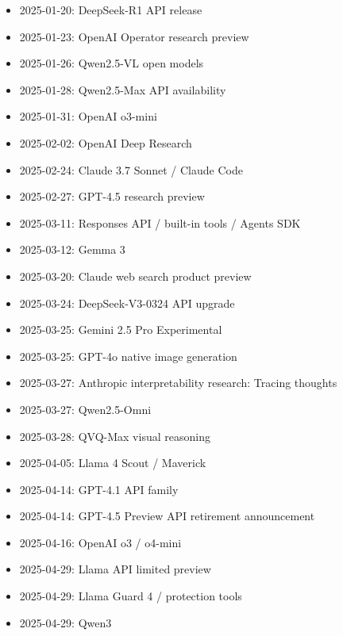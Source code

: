
\begin{itemize}
  \item 2025-01-20: DeepSeek-R1 API release
  \item 2025-01-23: OpenAI Operator research preview
  \item 2025-01-26: Qwen2.5-VL open models
  \item 2025-01-28: Qwen2.5-Max API availability
  \item 2025-01-31: OpenAI o3-mini
\end{itemize}
\autocite{src-650b567698aa,src-8c485019ad8d,src-8f8555b73e1b,src-95b210494c88,src-dc21f366b638}

\begin{itemize}
  \item 2025-02-02: OpenAI Deep Research
  \item 2025-02-24: Claude 3.7 Sonnet / Claude Code
  \item 2025-02-27: GPT-4.5 research preview
\end{itemize}
\autocite{src-3fa7f4cd510b,src-8fec3ef3a97d,src-a6c92f94a0af}

\begin{itemize}
  \item 2025-03-11: Responses API / built-in tools / Agents SDK
  \item 2025-03-12: Gemma 3
  \item 2025-03-20: Claude web search product preview
  \item 2025-03-24: DeepSeek-V3-0324 API upgrade
  \item 2025-03-25: Gemini 2.5 Pro Experimental
  \item 2025-03-25: GPT-4o native image generation
  \item 2025-03-27: Anthropic interpretability research: Tracing thoughts
  \item 2025-03-27: Qwen2.5-Omni
  \item 2025-03-28: QVQ-Max visual reasoning
\end{itemize}
\autocite{src-1bb16d7254b1,src-421ee9af3f80,src-6e15bd50b7db,src-78593f4b387f,src-877e7da88408,src-8cb736b33646,src-8f8555b73e1b,src-de4ffd746276,src-fdc10e3226e6}

\begin{itemize}
  \item 2025-04-05: Llama 4 Scout / Maverick
  \item 2025-04-14: GPT-4.1 API family
  \item 2025-04-14: GPT-4.5 Preview API retirement announcement
  \item 2025-04-16: OpenAI o3 / o4-mini
  \item 2025-04-29: Llama API limited preview
  \item 2025-04-29: Llama Guard 4 / protection tools
  \item 2025-04-29: Qwen3
\end{itemize}
\autocite{src-05f285e9757b,src-31799a46d8d0,src-383476bdf62e,src-3e4a3f3b3d83,src-bf92f3d905c3,src-fca961b24baf}

